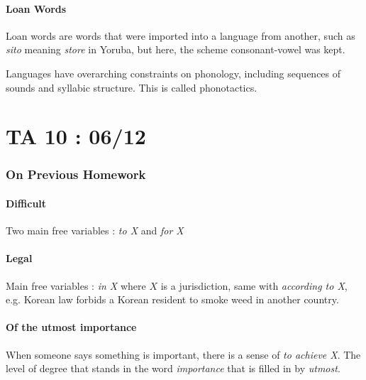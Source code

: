 \documentclass{cours}
\begin{document}
\subsection{Loan Words}
Loan words are words that were imported into a language from another, such as \textsl{sito} meaning \textsl{store} in Yoruba, but here, the scheme consonant-vowel was kept.

Languages have overarching constraints on phonology, including sequences of sounds and syllabic structure. This is called phonotactics.


\part{TA 10 : 06/12}
\section{On Previous Homework}
\subsection{Difficult}
Two main free variables : \textit{to X} and \textit{for X}

\subsection{Legal}
Main free variables : \textit{in X} where $X$ is a jurisdiction, same with \textit{according to X}, e.g. Korean law forbids a Korean resident to smoke weed in another country.

\subsection{Of the utmost importance}
When someone says something is important, there is a sense of \textit{to achieve X}. The level of degree that stands in the word \textit{importance} that is filled in by \textit{utmost}.
\end{document}
